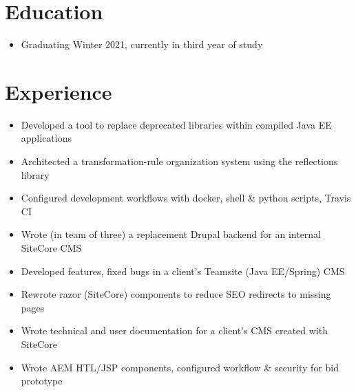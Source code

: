 \documentclass[]{rcf_cv}
\begin{document}
	
	
	
	\section{Education}
	
		\begin{itemize}
			\setlength\itemsep{-0.4em}
			\renewcommand\labelitemi{--}
			
			\item Graduating Winter 2021, currently in third year of study
			
		\end{itemize}
	
	\section{Experience}
	
		\begin{itemize}
			\setlength\itemsep{-0.4em}
			\renewcommand\labelitemi{--}
			
			\item Developed a tool to replace deprecated libraries within compiled Java EE applications
			\item Architected a transformation-rule organization system using the reflections library
			\item Configured development workflows with docker, shell \& python scripts, Travis CI

		\end{itemize}
	
		\begin{itemize}
			\setlength\itemsep{-0.4em}
			\renewcommand\labelitemi{--}
			
			\item Wrote (in team of three) a replacement Drupal backend for an internal SiteCore CMS
			\item Developed features, fixed bugs in a client's Teamsite (Java EE/Spring) CMS
			\item Rewrote razor (SiteCore) components to reduce SEO redirects to missing pages
			\item Wrote technical and user documentation for a client's CMS created with SiteCore 
			\item Wrote AEM HTL/JSP components, configured workflow \& security for bid prototype
			
		\end{itemize}
	
\end{document}
